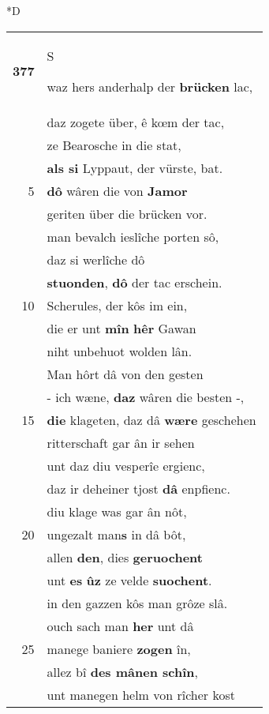 \documentclass[8pt,a4paper,notitlepage]{article}
\begin{document}
\begin{table}[ht]
\begin{minipage}[t]{0.5\linewidth}
\small
\begin{center}*D
\end{center}
\begin{tabular}{rl}
\textbf{377} & \begin{large}S\end{large}waz hers anderhalp der \textbf{brücken} lac,\\ 
 & daz zogete über, ê kœm der tac,\\ 
 & ze Bearosche in die stat,\\ 
 & \textbf{als si} Lyppaut, der vürste, bat.\\ 
5 & \textbf{dô} wâren die von \textbf{Jamor}\\ 
 & geriten über die brücken vor.\\ 
 & man bevalch ieslîche porten sô,\\ 
 & daz si werlîche dô\\ 
 & \textbf{stuonden}, \textbf{dô} der tac erschein.\\ 
10 & Scherules, der kôs im ein,\\ 
 & die er unt \textbf{mîn} \textbf{hêr} Gawan\\ 
 & niht unbehuot wolden lân.\\ 
 & Man hôrt dâ von den gesten\\ 
 & - ich wæne, \textbf{daz} wâren die besten -,\\ 
15 & \textbf{die} klageten, daz dâ \textbf{wære} geschehen\\ 
 & ritterschaft gar ân ir sehen\\ 
 & unt daz diu vesperîe ergienc,\\ 
 & daz ir deheiner tjost \textbf{dâ} enpfienc.\\ 
 & diu klage was gar ân nôt,\\ 
20 & ungezalt man\textbf{s} in dâ bôt,\\ 
 & allen \textbf{den}, dies \textbf{geruochent}\\ 
 & unt \textbf{es} \textbf{ûz} ze velde \textbf{suochent}.\\ 
 & in den gazzen kôs man grôze slâ.\\ 
 & ouch sach man \textbf{her} unt dâ\\ 
25 & manege baniere \textbf{zogen} în,\\ 
 & allez bî \textbf{des mânen schîn},\\ 
 & unt manegen helm von rîcher kost\\ 

\end{tabular}
\end{minipage}
\end{table}
\end{document}
